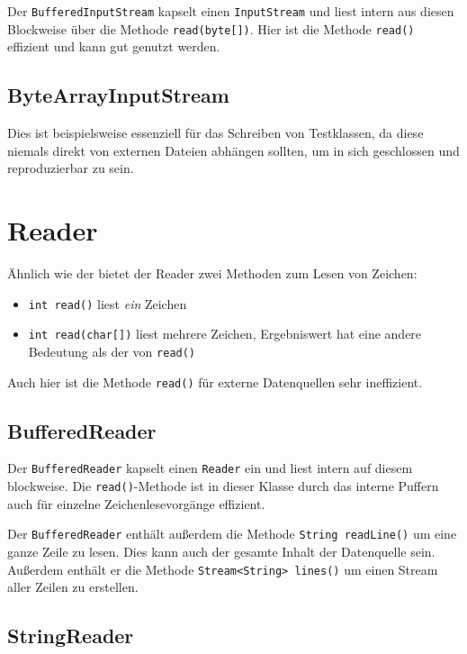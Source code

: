 Der \lstinline{BufferedInputStream} kapselt einen \lstinline{InputStream} und liest intern aus diesen
Blockweise über die Methode
\lstinline{read(byte[])}. Hier ist die Methode \lstinline{read()} effizient und
kann gut genutzt werden.

\subsection{ByteArrayInputStream}

Dies ist beispielsweise essenziell für das Schreiben von Testklassen, da diese
niemals direkt von externen Dateien abhängen sollten, um in sich geschlossen
und reproduzierbar zu sein.

\section{Reader}

Ähnlich wie der  bietet der Reader zwei Methoden zum Lesen von Zeichen:
\begin{itemize}
    \item \lstinline{int read()} liest \textit{ein} Zeichen
    \item \lstinline{int read(char[])} liest mehrere Zeichen, Ergebniswert hat eine andere
          Bedeutung als der von \lstinline{read()}
\end{itemize}

Auch hier ist die Methode \lstinline{read()} für externe Datenquellen
sehr ineffizient.

\subsection{BufferedReader}

Der \lstinline{BufferedReader} kapselt einen \lstinline{Reader} ein und liest intern auf diesem
blockweise. Die \lstinline{read()}-Methode ist in dieser Klasse durch das
interne Puffern auch für einzelne Zeichenlesevorgänge effizient.

Der \lstinline{BufferedReader} enthält außerdem die Methode \lstinline{String readLine()}
um eine ganze Zeile zu lesen. Dies kann auch der gesamte Inhalt der Datenquelle
sein. Außerdem enthält er die Methode \lstinline{Stream<String> lines()} um
einen Stream aller Zeilen zu erstellen.

\subsection{StringReader}

